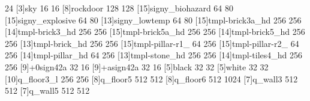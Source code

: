 24
[3]sky 16 16
[8]rockdoor 128 128
[15]signy_biohazard 64 80
[15]signy_explosive 64 80
[13]signy_lowtemp 64 80
[15]tmpl-brick3a_hd 256 256
[14]tmpl-brick3_hd 256 256
[15]tmpl-brick5a_hd 256 256
[14]tmpl-brick5_hd 256 256
[13]tmpl-brick_hd 256 256
[15]tmpl-pillar-r1_ 64 256
[15]tmpl-pillar-r2_ 64 256
[14]tmpl-pillar_hd 64 256
[13]tmpl-stone_hd 256 256
[14]tmpl-tiles4_hd 256 256
[9]+0sign42a 32 16
[9]+asign42a 32 16
[5]black 32 32
[5]white 32 32
[10]q_floor3_l 256 256
[8]q_floor5 512 512
[8]q_floor6 512 1024
[7]q_wall3 512 512
[7]q_wall5 512 512
